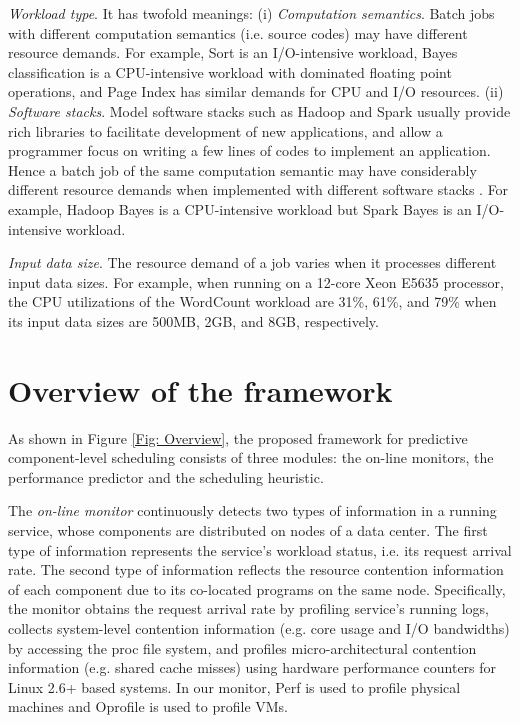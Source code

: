 \documentclass[10pt, conference, compsocconf]{IEEEtran}
\begin{document}
\emph{Workload type}. It has twofold meanings: (i) \emph{Computation semantics}. Batch jobs with different computation semantics (i.e. source codes) may have different resource demands. For example, Sort is an I/O-intensive workload, Bayes classification is a CPU-intensive workload with dominated floating point operations, and Page Index has similar demands for CPU and I/O resources. (ii) \emph{Software stacks}. Model software stacks such as Hadoop and Spark usually provide rich libraries to facilitate development of new applications, and allow a programmer focus on writing a few lines of codes to implement an application. Hence a batch job of the same computation semantic may have considerably different resource demands when implemented with different software stacks \cite{jia2014characterizing}. For example, Hadoop Bayes is a CPU-intensive workload but Spark Bayes is an I/O-intensive workload.

\emph{Input data size}. The resource demand of a job varies when it processes different input data sizes. For example, when running on a 12-core Xeon E5635 processor, the CPU utilizations of the WordCount workload are 31\%, 61\%, and 79\% when its input data sizes are 500MB, 2GB, and 8GB, respectively.




















\section{Overview of the framework} \label{Section: Overview of the framework}

As shown in Figure \ref{Fig: Overview}, the proposed framework for predictive component-level scheduling consists of three modules: the on-line monitors, the performance predictor and the scheduling heuristic.

The \emph{on-line monitor} continuously detects two types of information in a running service, whose components are distributed on  nodes of a data center. The first type of information represents the service's workload status, i.e. its request arrival rate. The second type of information reflects the resource contention information of each component due to its co-located programs on the same node. Specifically, the monitor obtains the request arrival rate by profiling service's running logs, collects system-level contention information (e.g. core usage and I/O bandwidths) by accessing the proc file system, and profiles micro-architectural contention information (e.g. shared cache misses) using hardware performance counters for Linux 2.6+ based systems. In our monitor, Perf \cite{PerfWebsite} is used to profile physical machines and Oprofile \cite{OprofileWebsite} is used to profile VMs.
\end{document}
